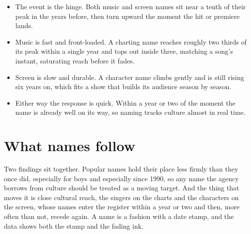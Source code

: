 \documentclass[11pt,preprint]{elsarticle}
\numberwithin{equation}{section}
\numberwithin{figure}{section}
\numberwithin{table}{section}
\def\tightlist{} %
\begin{document}
\begin{itemize}
\tightlist
\item
  The event is the hinge. Both music and screen names sit near a tenth
  of their peak in the years before, then turn upward the moment the hit
  or premiere lands.
\item
  Music is fast and front-loaded. A charting name reaches roughly two
  thirds of its peak within a single year and tops out inside three,
  matching a song's instant, saturating reach before it fades.
\item
  Screen is slow and durable. A character name climbs gently and is
  still rising six years on, which fits a show that builds its audience
  season by season.
\item
  Either way the response is quick. Within a year or two of the moment
  the name is already well on its way, so naming tracks culture almost
  in real time.
\end{itemize}

\section*{What names follow}\label{what-names-follow}

Two findings sit together. Popular names hold their place less firmly
than they once did, especially for boys and especially since 1990, so
any name the agency borrows from culture should be treated as a moving
target. And the thing that moves it is close cultural reach, the singers
on the charts and the characters on the screen, whose names enter the
register within a year or two and then, more often than not, recede
again. A name is a fashion with a date stamp, and the data shows both
the stamp and the fading ink.


\end{document}
